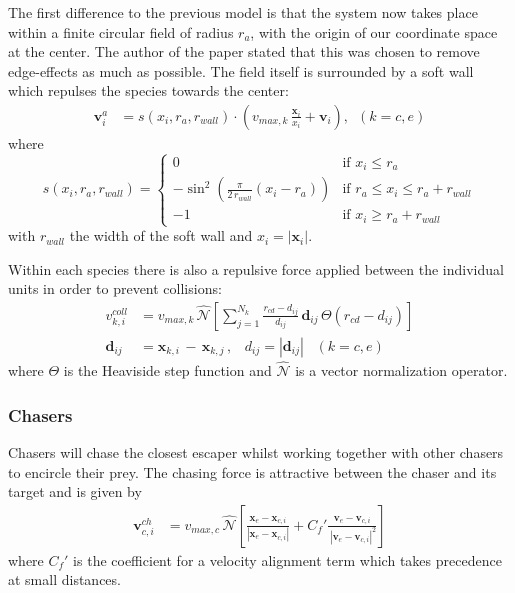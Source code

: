 \documentclass[%
11pt,
amsmath, amssymb,
aps,
pra
]{revtex4-2}
\begin{document}
The first difference to the previous model 
is that the system now takes place within a finite circular field of radius \(r_a\), with the origin of our coordinate
space at the center. 
The author of the paper stated that this was chosen to remove edge-effects as much as possible.
The field itself is surrounded by a soft wall \cite{han2006soft} which repulses the species towards the center:
\begin{align}
    \mathbf{v}_i^a &= s(x_i, r_a, r_{wall})\cdot \left(v_{max,k} \, \frac{\mathbf{x}_{i}}{x_i} + \mathbf{v}_i\right)
    ,\,\,\, (k = c, e)
\end{align}
where
\begin{equation}
    s(x_i, r_a, r_{wall}) = \begin{cases}
        0 & \text{if } x_i \le r_a\\
        -\sin^2\left(\frac{\pi}{2 \,r_{wall}} (x_i - r_a)    \right) & \text{if } r_a \le x_i \le r_a + r_{wall} \\
        -1 & \text{if } x_i \ge r_a + r_{wall}
    \end{cases}
\end{equation}
with \(r_{wall}\) the width of the soft wall and \(x_i = |\mathbf{x}_i|\).

Within each species there is also a repulsive force applied between the individual units in order to prevent collisions:
\begin{align}
    v_{k, i}^{coll} &= v_{max, k}\, \hat{\mathcal{N}}\left[  \sum_{j=1}^{N_k} \frac{r_{cd} - d_{ij}}{d_{ij}}\,
    \mathbf{d}_{ij} \, \Theta(r_{cd} - d_{ij}) \right] \\
    \mathbf{d}_{ij} &= \mathbf{x}_{k, i}\, - \,\mathbf{x}_{k, j}\,,\,\, \, \,\,d_{ij} = |\mathbf{d}_{ij}|\,\,\, \, \,(k = c, e)
\end{align}
where \(\Theta\) is the Heaviside step function and \(\hat{\mathcal{N}}\) is a vector normalization operator.

\subsubsection{Chasers}
Chasers will chase the closest escaper whilst working together with other chasers to encircle their prey.
The chasing force is attractive between the chaser and its target and is given by
\begin{align}
    \mathbf{v}_{c, i}^{ch} &= v_{max, c} \, \hat{\mathcal{N}} \left[ 
        \frac{\mathbf{x}_e - \mathbf{x}_{c,i}}{|\mathbf{x}_e - \mathbf{x}_{c,i}|} 
        + C_f' \frac{\mathbf{v}_e - \mathbf{v}_{c,i}}{\,|\mathbf{v}_e - \mathbf{v}_{c,i}|^2}
    \right]
\end{align}
where \(C_f'\) is the coefficient for a velocity alignment term which takes precedence at small distances.
\end{document}
